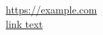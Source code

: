 \documentclass[a4paper]{standalone}
\begin{document}
    \url{https://example.com}
    \\
    \href{https://example.com}{link text}
\end{document}
